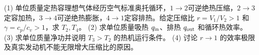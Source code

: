 (1) 单位质量定热容理想气体经历空气标准奥托循环，\(1\to 2\)可逆绝热压缩，\(2\to 3\)定容加热，\(3\to 4\)可逆绝热膨胀，\(4\to 1\)定容排热。给定压缩比 \(r=V_1/V_2>1\) 和 \(\gamma=c_p/c_v>1\)，求 \(T_2,T_4\)。
(2) 求单位质量吸热 \(q_{\rm in}\)、排热 \(q_{\rm out}\) 和循环热效率。
(3) 求单位质量净功并说明 \(T_3>T_2\) 的热机运行条件。
(4) 讨论 \(r\to1\) 的效率极限及真实发动机不能无限增大压缩比的原因。
